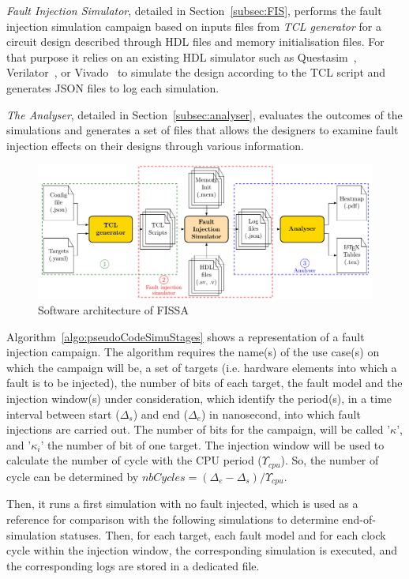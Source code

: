 \textit{Fault Injection Simulator}, detailed in Section~\ref{subsec:FIS}, performs the fault injection simulation campaign based on inputs files from \textit{TCL generator} for a circuit design described through HDL files and memory initialisation files. For that purpose it relies on an existing HDL simulator such as Questasim~\cite{questasim}, Verilator~\cite{verilator}, or Vivado~\cite{vivado} to simulate the design according to the TCL script and generates JSON files to log each simulation.

\textit{The Analyser}, detailed in Section~\ref{subsec:analyser}, evaluates the outcomes of the simulations and generates a set of files that allows the designers to examine fault injection effects on their designs through various information.


\begin{figure}[ht]
    \centering
    \includegraphics[width=\textwidth, page=2]{c4_fissa/img/fissa/archi_fissa.pdf}
    \caption{Software architecture of FISSA}
    \label{fig:archi_fissa}
\end{figure}

Algorithm~\ref{algo:pseudoCodeSimuStages} shows a representation of a fault injection campaign. The algorithm requires the name(s) of the use case(s) on which the campaign will be, a set of targets (i.e. hardware elements into which a fault is to be injected), the number of bits of each target, the fault model and the injection window(s) under consideration, which identify the period(s), in a time interval between start ($\Delta_s$) and end ($\Delta_e$) in nanosecond, into which fault injections are carried out.
The number of bits for the campaign, will be called '$\kappa$', and '$\kappa_i$' the number of bit of one target.
The injection window will be used to calculate the number of cycle with the CPU period ($\varUpsilon_{cpu}$). So, the number of cycle can be determined by $nbCycles = (\Delta_e - \Delta_s) / \varUpsilon_{cpu}$.

Then, it runs a first simulation with no fault injected, which is used as a reference for comparison with the following simulations to determine end-of-simulation statuses. 
Then, for each target, each fault model and for each clock cycle within the injection window, the corresponding simulation is executed, and the corresponding logs are stored in a dedicated file.


